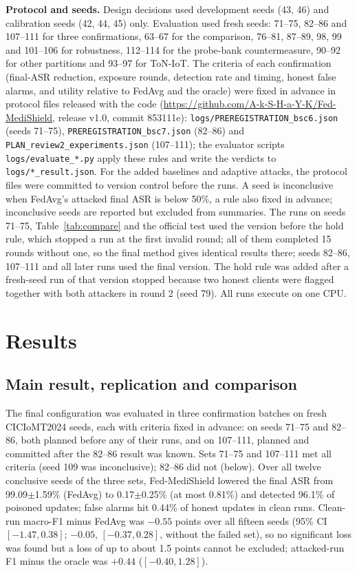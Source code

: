 \documentclass[conference]{IEEEtran}
\begin{document}
\textbf{Protocol and seeds.} Design decisions used development seeds (43, 46) and calibration seeds (42, 44, 45) only. Evaluation used fresh seeds: 71--75, 82--86 and 107--111 for three confirmations, 63--67 for the comparison, 76--81, 87--89, 98, 99 and 101--106 for robustness, 112--114 for the probe-bank countermeasure, 90--92 for other partitions and 93--97 for ToN-IoT. The criteria of each confirmation (final-ASR reduction, exposure rounds, detection rate and timing, honest false alarms, and utility relative to FedAvg and the oracle) were fixed in advance in protocol files released with the code (\url{https://github.com/A-k-S-H-a-Y-K/Fed-MediShield}, release v1.0, commit 853111e): \texttt{logs/PREREGISTRATION\_bsc6.json} (seeds 71--75), \texttt{PREREGISTRATION\_bsc7.json} (82--86) and \texttt{PLAN\_review2\_experiments.json} (107--111); the evaluator scripts \texttt{logs/evaluate\_*.py} apply these rules and write the verdicts to \texttt{logs/*\_result.json}. For the added baselines and adaptive attacks, the protocol files were committed to version control before the runs. A seed is inconclusive when FedAvg's attacked final ASR is below 50\%, a rule also fixed in advance; inconclusive seeds are reported but excluded from summaries. The runs on seeds 71--75, Table~\ref{tab:compare} and the official test used the version before the hold rule, which stopped a run at the first invalid round; all of them completed 15 rounds without one, so the final method gives identical results there; seeds 82--86, 107--111 and all later runs used the final version. The hold rule was added after a fresh-seed run of that version stopped because two honest clients were flagged together with both attackers in round 2 (seed 79). All runs execute on one CPU.

\section{Results}

\subsection{Main result, replication and comparison}
The final configuration was evaluated in three confirmation batches on fresh CICIoMT2024 seeds, each with criteria fixed in advance: on seeds 71--75 and 82--86, both planned before any of their runs, and on 107--111, planned and committed after the 82--86 result was known. Sets 71--75 and 107--111 met all criteria (seed 109 was inconclusive); 82--86 did not (below). Over all twelve conclusive seeds of the three sets, Fed-MediShield lowered the final ASR from 99.09$\pm$1.59\% (FedAvg) to 0.17$\pm$0.25\% (at most 0.81\%) and detected 96.1\% of poisoned updates; false alarms hit 0.44\% of honest updates in clean runs. Clean-run macro-F1 minus FedAvg was $-0.55$ points over all fifteen seeds (95\% CI $[-1.47, 0.38]$; $-0.05$, $[-0.37, 0.28]$, without the failed set), so no significant loss was found but a loss of up to about 1.5 points cannot be excluded; attacked-run F1 minus the oracle was $+0.44$ ($[-0.40, 1.28]$).
\end{document}
